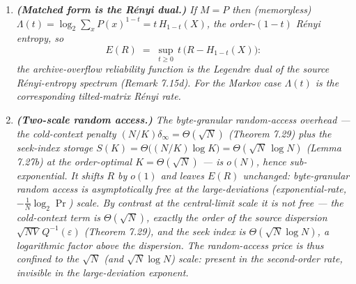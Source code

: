\documentclass[
]{article}
\begin{document}
\begin{enumerate}
{dispersion. The exponents of the manuscript's tail bounds (Theorems 7.14, 7.25) are
each lower bounds on the exact rate $E$, which dominates them; among themselves they
do \emph{not} order uniformly in $a$ --- the variance-aware Bernstein bound is sharp
near the mean (matching the leading $a^2$ constant) while the worst-case Azuma range
bound can be the tighter of the two in the tail --- so only the exact exponent $E$ is
the envelope.}
\item \emph{\textbf{(Matched form is the R\'enyi dual.)} If $M=P$ then (memoryless)
$\Lambda(t)=\log_2\sum_x P(x)^{1-t}=t\,H_{1-t}(X)$, the order-$(1{-}t)$ R\'enyi
entropy, so}
\[
  E(R)\;=\;\sup_{t\ge0}\,t\,\bigl(R-H_{1-t}(X)\bigr):
\]
\emph{the archive-overflow reliability function is the Legendre dual of the source
R\'enyi-entropy spectrum (Remark 7.15d). For the Markov case $\Lambda(t)$ is the
corresponding tilted-matrix R\'enyi rate.}
\item \emph{\textbf{(Two-scale random access.)} The byte-granular random-access
overhead --- the cold-context penalty $(N/K)\delta_\infty=\Theta(\sqrt N)$
(Theorem 7.29) plus the seek-index storage $S(K)=\Theta\!\bigl((N/K)\log K\bigr)=
\Theta(\sqrt N\,\log N)$ (Lemma 7.27b) at the order-optimal $K=\Theta(\sqrt N)$ ---
is $o(N)$, hence sub-exponential. It shifts $R$ by $o(1)$ and leaves $E(R)$
\emph{unchanged}: byte-granular random access is asymptotically \emph{free at the
large-deviations (exponential-rate, $-\tfrac1N\log_2\Pr$) scale}. By contrast at the
central-limit scale it is \emph{not} free --- the cold-context term is
$\Theta(\sqrt N)$, exactly the order of the source dispersion
$\sqrt{NV}\,Q^{-1}(\varepsilon)$ (Theorem 7.29), and the seek index is
$\Theta(\sqrt N\log N)$, a logarithmic factor \emph{above} the dispersion. The
random-access price is thus \emph{confined to the $\sqrt N$ (and $\sqrt N\log N$)
scale}: present in the second-order rate, invisible in the large-deviation
exponent.}
\end{enumerate}
\end{document}
